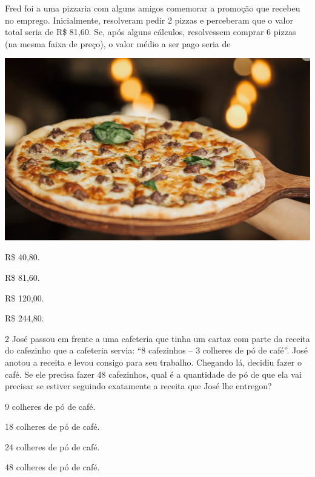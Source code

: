 \begin{minipage}{.5\textwidth}
Fred foi a uma pizzaria com alguns amigos comemorar a promoção que recebeu no emprego.
Inicialmente, resolveram pedir 2 pizzas e perceberam que o valor total
seria de R\$ 81,60. Se, após alguns cálculos, resolvessem comprar 6
pizzas (na mesma faixa de preço), o valor médio a ser pago seria de
\end{minipage}\hspace{.5cm}
\begin{minipage}{.5\textwidth}
\includegraphics[width=\textwidth]{media/image72.png}
\end{minipage}

\begin{multicols}{2}
\begin{escolha}
\item
  R\$ 40,80.
\item
  R\$ 81,60.
\item
  R\$ 120,00.
\item
  R\$ 244,80.
\end{escolha}
\end{multicols}

\num{2} José passou em frente a uma cafeteria que tinha um cartaz com parte da
receita do cafezinho que a cafeteria servia: ``8 cafezinhos -- 3 colheres de pó de café''.
José anotou a receita e levou consigo para seu trabalho. Chegando lá,
decidiu fazer o café. Se ele precisa fazer 48 cafezinhos, qual é a
quantidade de pó de que ela vai precisar se estiver seguindo exatamente a
receita que José lhe entregou?

\begin{escolha}
\item
  9 colheres de pó de café.
\item
  18 colheres de pó de café.
\item
  24 colheres de pó de café.
\item
  48 colheres de pó de café.
\end{escolha}

